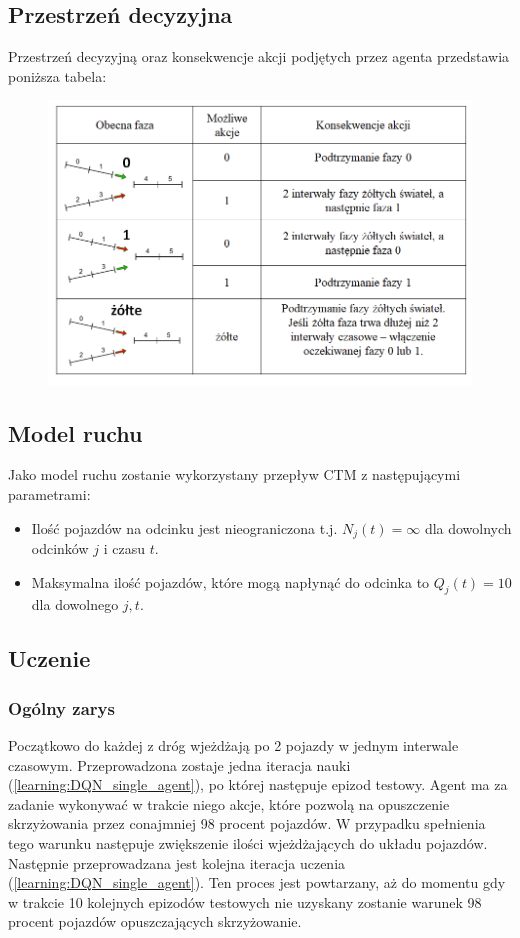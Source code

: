 \documentclass[12pt]{book}
\theoremstyle{plain}
\newcommand{\myref}[1]{(\ref{#1})}
\begin{document}
\subsection{Przestrzeń decyzyjna}
Przestrzeń decyzyjną oraz konsekwencje akcji podjętych przez agenta przedstawia poniższa tabela:
\begin{figure}[H]
	\centering
	\includegraphics[width=17cm]{images/env_14_akcje}
	\label{fig:env_14_akcje}
\end{figure} \noindent

\subsection{Model ruchu}
Jako model ruchu zostanie wykorzystany przepływ CTM z następującymi parametrami:
\begin{itemize}
	\item Ilość pojazdów na odcinku jest nieograniczona t.j. $N_j(t)=\infty$ dla dowolnych odcinków $j$ i czasu $t$.
	\item Maksymalna ilość pojazdów, które mogą napłynąć do odcinka to $Q_j(t)=10$ dla dowolnego $j,t$.
\end{itemize}

\subsection{Uczenie}
\subsubsection{Ogólny zarys}
Początkowo do każdej z dróg wjeżdżają po 2 pojazdy w jednym interwale czasowym. Przeprowadzona zostaje jedna iteracja nauki \myref{learning:DQN_single_agent}, po której następuje epizod testowy. Agent ma za zadanie wykonywać w trakcie niego akcje, które pozwolą na opuszczenie skrzyżowania przez conajmniej 98 procent pojazdów. W przypadku spełnienia tego warunku następuje zwiększenie ilości wjeżdżających do układu pojazdów. Następnie przeprowadzana jest kolejna iteracja uczenia \myref{learning:DQN_single_agent}. Ten proces jest powtarzany, aż do momentu gdy w trakcie 10 kolejnych epizodów testowych nie uzyskany zostanie warunek 98 procent pojazdów opuszczających skrzyżowanie. 
\end{document}
